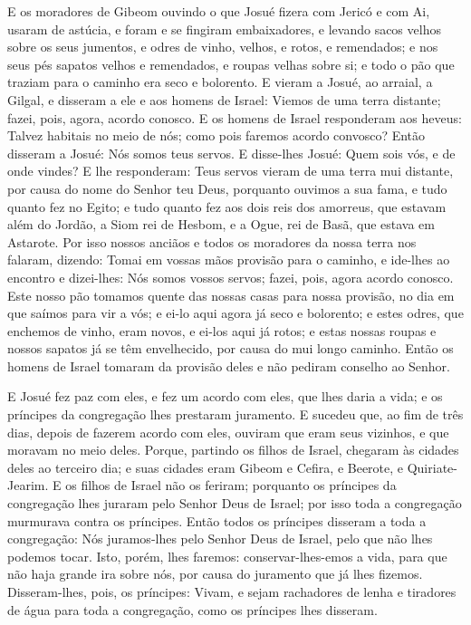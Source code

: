 E os moradores de Gibeom ouvindo o que Josué fizera com Jericó e
com Ai, usaram de astúcia, e foram e se fingiram embaixadores, e
levando sacos velhos sobre os seus jumentos, e odres de vinho,
velhos, e rotos, e remendados; e nos seus pés sapatos velhos e
remendados, e roupas velhas sobre si; e todo o pão que traziam para
o caminho era seco e bolorento. E vieram a Josué, ao arraial, a
Gilgal, e disseram a ele e aos homens de Israel: Viemos de uma terra
distante; fazei, pois, agora, acordo conosco. E os homens de
Israel responderam aos heveus: Talvez habitais no meio de nós; como
pois faremos acordo convosco? Então disseram a Josué: Nós somos
teus servos. E disse-lhes Josué: Quem sois vós, e de onde vindes?
E lhe responderam: Teus servos vieram de uma terra mui distante,
por causa do nome do Senhor teu Deus, porquanto ouvimos a sua fama,
e tudo quanto fez no Egito; e tudo quanto fez aos dois reis
dos amorreus, que estavam além do Jordão, a Siom rei de Hesbom, e a
Ogue, rei de Basã, que estava em Astarote. Por isso nossos
anciãos e todos os moradores da nossa terra nos falaram, dizendo:
Tomai em vossas mãos provisão para o caminho, e ide-lhes ao encontro
e dizei-lhes: Nós somos vossos servos; fazei, pois, agora acordo
conosco. Este nosso pão tomamos quente das nossas casas para
nossa provisão, no dia em que saímos para vir a vós; e ei-lo aqui
agora já seco e bolorento; e estes odres, que enchemos de
vinho, eram novos, e ei-los aqui já rotos; e estas nossas roupas e
nossos sapatos já se têm envelhecido, por causa do mui longo
caminho. Então os homens de Israel tomaram da provisão deles
e não pediram conselho ao Senhor.

E Josué fez paz com eles, e fez um acordo com eles, que lhes
daria a vida; e os príncipes da congregação lhes prestaram
juramento. E sucedeu que, ao fim de três dias, depois de
fazerem acordo com eles, ouviram que eram seus vizinhos, e que
moravam no meio deles. Porque, partindo os filhos de Israel,
chegaram às cidades deles ao terceiro dia; e suas cidades eram
Gibeom e Cefira, e Beerote, e Quiriate-Jearim. E os filhos de
Israel não os feriram; porquanto os príncipes da congregação lhes
juraram pelo Senhor Deus de Israel; por isso toda a congregação
murmurava contra os príncipes. Então todos os príncipes
disseram a toda a congregação: Nós juramos-lhes pelo Senhor Deus de
Israel, pelo que não lhes podemos tocar. Isto, porém, lhes
faremos: conservar-lhes-emos a vida, para que não haja grande ira
sobre nós, por causa do juramento que já lhes fizemos.
Disseram-lhes, pois, os príncipes: Vivam, e sejam rachadores
de lenha e tiradores de água para toda a congregação, como os
príncipes lhes disseram.

